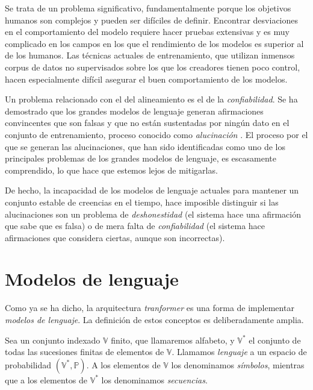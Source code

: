 Se trata de un problema significativo, fundamentalmente porque los objetivos humanos son complejos y pueden ser difíciles de definir. Encontrar desviaciones en el comportamiento del modelo requiere hacer pruebas extensivas y es muy complicado en los campos en los que el rendimiento de los modelos es superior al de los humanos. Las técnicas actuales de entrenamiento, que utilizan inmensos corpus de datos no supervisados sobre los que los creadores tienen poco control, hacen especialmente difícil asegurar el buen comportamiento de los modelos.

Un problema relacionado con el del alineamiento es el de la \textit{confiabilidad}. Se ha demostrado que los grandes modelos de lenguaje generan afirmaciones convincentes que son falsas y que no están sustentadas por ningún dato en el conjunto de entrenamiento, proceso conocido como \textit{alucinación} \cite{gpthallucination}. El proceso por el que se generan las alucinaciones, que han sido identificadas como uno de los principales problemas de los grandes modelos de lenguaje, es escasamente comprendido, lo que hace que estemos lejos de mitigarlas.

De hecho, la incapacidad de los modelos de lenguaje actuales para mantener un conjunto estable de creencias en el tiempo, hace imposible distinguir si las alucinaciones son un problema de \textit{deshonestidad} (el sistema hace una afirmación que sabe que es falsa) o de mera falta de \textit{confiabilidad} (el sistema hace afirmaciones que considera ciertas, aunque son incorrectas).

\section{Modelos de lenguaje}
Como ya se ha dicho, la arquitectura \textit{tranformer} es una forma de implementar \textit{modelos de lenguaje}. La definición de estos conceptos es deliberadamente amplia.

\begin{definition}[Lenguaje]
    Sea un conjunto indexado \( \mathbb{V} \) finito, que llamaremos alfabeto, y \( \mathbb{V}^* \) el conjunto de todas las sucesiones finitas de elementos de \( \mathbb{V} \). Llamamos \textit{lenguaje} a un espacio de probabilidad \( (\mathbb{V}^*, \mathbb{P}) \). A los elementos de \( \mathbb{V} \) los denominamos \textit{símbolos}, mientras que a los elementos de  \( \mathbb{V}^* \) los denominamos \textit{secuencias}.
\end{definition}

